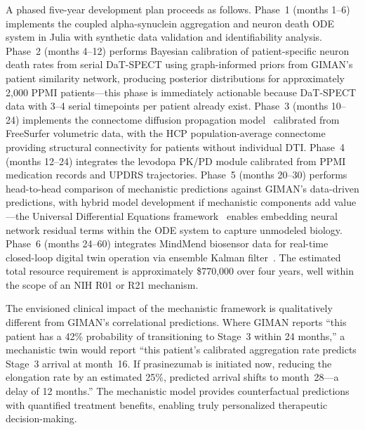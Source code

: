A phased five-year development plan proceeds as follows. Phase~1 (months 1--6) implements the coupled alpha-synuclein aggregation and neuron death ODE system in Julia with synthetic data validation and identifiability analysis. Phase~2 (months 4--12) performs Bayesian calibration of patient-specific neuron death rates from serial DaT-SPECT using graph-informed priors from GIMAN's patient similarity network, producing posterior distributions for approximately 2,000 PPMI patients---this phase is immediately actionable because DaT-SPECT data with 3--4 serial timepoints per patient already exist. Phase~3 (months 10--24) implements the connectome diffusion propagation model~\cite{raj2012,raj2019,fornari2019} calibrated from FreeSurfer volumetric data, with the HCP population-average connectome providing structural connectivity for patients without individual DTI. Phase~4 (months 12--24) integrates the levodopa PK/PD module calibrated from PPMI medication records and UPDRS trajectories. Phase~5 (months 20--30) performs head-to-head comparison of mechanistic predictions against GIMAN's data-driven predictions, with hybrid model development if mechanistic components add value---the Universal Differential Equations framework~\cite{rackauckas2020} enables embedding neural network residual terms within the ODE system to capture unmodeled biology. Phase~6 (months 24--60) integrates MindMend biosensor data for real-time closed-loop digital twin operation via ensemble Kalman filter~\cite{cheng2023}. The estimated total resource requirement is approximately \$770,000 over four years, well within the scope of an NIH R01 or R21 mechanism.

The envisioned clinical impact of the mechanistic framework is qualitatively different from GIMAN's correlational predictions. Where GIMAN reports ``this patient has a 42\% probability of transitioning to Stage~3 within 24 months,'' a mechanistic twin would report ``this patient's calibrated aggregation rate predicts Stage~3 arrival at month~16. If prasinezumab is initiated now, reducing the elongation rate by an estimated 25\%, predicted arrival shifts to month~28---a delay of 12 months.'' The mechanistic model provides counterfactual predictions with quantified treatment benefits, enabling truly personalized therapeutic decision-making.
